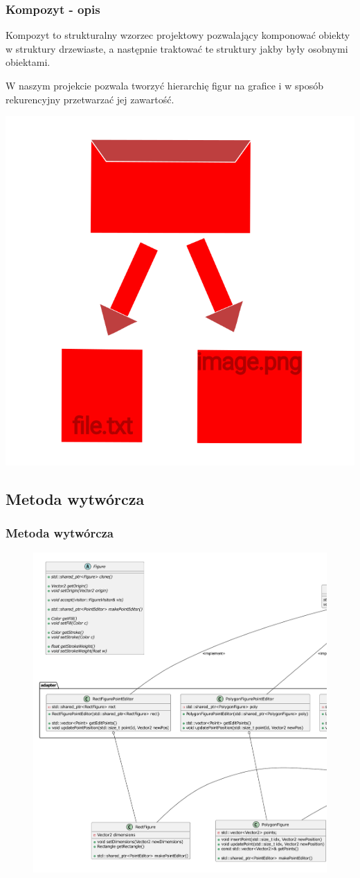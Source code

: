 \documentclass[
	11pt,]{beamer}
\begin{document}
\begin{frame}
	\frametitle{Kompozyt - opis}
	Kompozyt to strukturalny wzorzec projektowy pozwalający komponować obiekty w struktury drzewiaste, a następnie traktować te struktury jakby były osobnymi obiektami.
	
	\vfill
	
	W naszym projekcie pozwala tworzyć hierarchię figur na grafice i w sposób rekurencyjny przetwarzać jej zawartość.
	
    \begin{center}
    	\includegraphics[width=.25\textwidth]{figures/composite.png}
    \end{center}
	
\end{frame}

\subsection{Metoda wytwórcza}

\begin{frame}
	\frametitle{Metoda wytwórcza}
	
	\begin{figure}
		\includegraphics[height=0.7\textheight]{figures/fac.pdf}
	\end{figure}
\end{frame}
\end{document}
